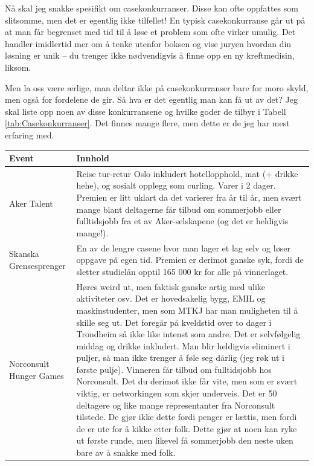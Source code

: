 Nå skal jeg snakke spesifikt om casekonkurranser. Disse kan ofte oppfattes som slitsomme, men det er egentlig ikke tilfellet! En typisk casekonkurranse går ut på at man får begrenset med tid til å løse et problem som ofte virker umulig. Det handler imidlertid mer om å tenke utenfor boksen og vise juryen hvordan din løsning er unik – du trenger ikke nødvendigvis å finne opp en ny kreftmedisin, liksom. 

Men la oss være ærlige, man deltar ikke på casekonkurranser bare for moro skyld, men også for fordelene de gir. Så hva er det egentlig man kan få ut av det? Jeg skal liste opp noen av disse konkurransene og hvilke goder de tilbyr i Tabell \ref{tab:Casekonkurranser}. Det finnes mange flere, men dette er de jeg har mest erfaring med.

\begin{table}[H]
    \centering
    \begin{tabular}{p{3cm}p{10cm}}
        \toprule
        Event & Innhold \\
        \midrule
        Aker Talent & Reise tur-retur Oslo inkludert hotellopphold, mat (+ drikke hehe), og sosialt opplegg som curling. Varer i 2 dager. Premien er litt uklart da det varierer fra år til år, men svært mange blant deltagerne får tilbud om sommerjobb eller fulltidsjobb fra et av Aker-selskapene (og det er heldigvis mange!). \\
        
        Skanska Grensesprenger & En av de lengre casene hvor man lager et lag selv og løser oppgave på egen tid. Premien er derimot ganske syk, fordi de sletter studielån opptil 165 000 kr for alle på vinnerlaget. \\
        
        Norconsult Hunger Games & Høres weird ut, men faktisk ganske artig med ulike aktiviteter osv. Det er hovedsakelig bygg, EMIL og maskinstudenter, men som MTKJ har man muligheten til å skille seg ut. Det foregår på kveldstid over to dager i Trondheim så ikke like intenst som andre. Det er selvfølgelig middag og drikke inkludert. Man blir heldigvis eliminert i puljer, så man ikke trenger å føle seg dårlig (jeg røk ut i første pulje). Vinneren får tilbud om fulltidsjobb hos Norconsult. Det du derimot ikke får vite, men som er svært viktig, er networkingen som skjer underveis. Det er 50 deltagere og like mange representanter fra Norconsult tilstede. De gjør ikke dette fordi penger er lættis, men fordi de er ute for å kikke etter folk. Dette gjør at noen kan ryke ut første runde, men likevel få sommerjobb den neste uken bare av å snakke med folk. \\
        

\end{tabular}
\end{table}
